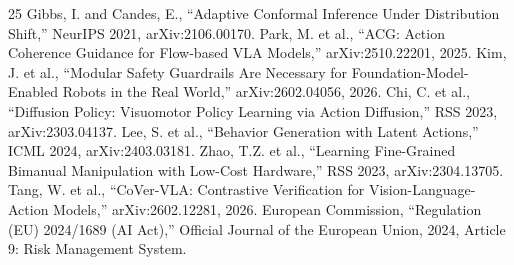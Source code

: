 \documentclass[conference]{IEEEtran}
\begin{document}
\begin{thebibliography}{25}
 Gibbs, I. and Candes, E., ``Adaptive Conformal Inference Under Distribution Shift,'' NeurIPS 2021, arXiv:2106.00170.
 Park, M. et al., ``ACG: Action Coherence Guidance for Flow-based VLA Models,'' arXiv:2510.22201, 2025.
 Kim, J. et al., ``Modular Safety Guardrails Are Necessary for Foundation-Model-Enabled Robots in the Real World,'' arXiv:2602.04056, 2026.
 Chi, C. et al., ``Diffusion Policy: Visuomotor Policy Learning via Action Diffusion,'' RSS 2023, arXiv:2303.04137.
 Lee, S. et al., ``Behavior Generation with Latent Actions,'' ICML 2024, arXiv:2403.03181.
 Zhao, T.Z. et al., ``Learning Fine-Grained Bimanual Manipulation with Low-Cost Hardware,'' RSS 2023, arXiv:2304.13705.
 Tang, W. et al., ``CoVer-VLA: Contrastive Verification for Vision-Language-Action Models,'' arXiv:2602.12281, 2026.
 European Commission, ``Regulation (EU) 2024/1689 (AI Act),'' Official Journal of the European Union, 2024, Article 9: Risk Management System.
\end{thebibliography}
\end{document}
